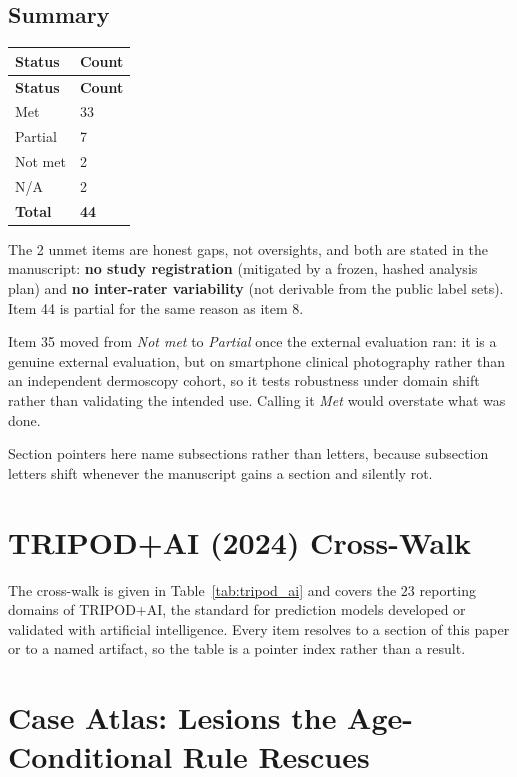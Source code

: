 \subsection*{Summary}


\begin{longtable}{@{}lp{}@{}}
\toprule
\textbf{Status} & \textbf{Count} \\
\midrule
\endfirsthead
\toprule
\textbf{Status} & \textbf{Count} \\
\midrule
\endhead
\bottomrule
\endfoot
Met & 33 \\
Partial & 7 \\
Not met & 2 \\
N/A & 2 \\
\textbf{Total} & \textbf{44} \\
\end{longtable}


The 2 unmet items are honest gaps, not oversights, and both are stated in the manuscript: \textbf{no study registration} (mitigated by a frozen, hashed analysis plan) and \textbf{no inter-rater variability} (not derivable from the public label sets). Item 44 is partial for the same reason as item 8.


Item 35 moved from \emph{Not met} to \emph{Partial} once the external evaluation ran: it is a genuine external evaluation, but on smartphone clinical photography rather than an independent dermoscopy cohort, so it tests robustness under domain shift rather than validating the intended use. Calling it \emph{Met} would overstate what was done.


Section pointers here name subsections rather than letters, because subsection letters shift whenever the manuscript gains a section and silently rot.


\section{TRIPOD+AI (2024) Cross-Walk}
\label{app:tripod}

The cross-walk is given in Table~\ref{tab:tripod_ai} and covers the $23$ reporting domains of
TRIPOD+AI, the standard for prediction models developed or validated with artificial
intelligence. Every item resolves to a section of this paper or to a named artifact, so the
table is a pointer index rather than a result.



\section{Case Atlas: Lesions the Age-Conditional Rule Rescues}
\label{app:atlas}


